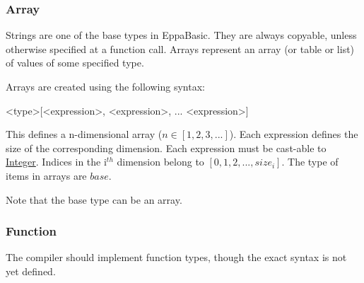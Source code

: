 \subsubsection{Array}
\label{type:Array}
Strings are one of the base types in EppaBasic.
They are always copyable, unless otherwise specified at a function call.
Arrays represent an array (or table or list) of values of some specified type.

Arrays are created using the following syntax:
\begin{grammar}
<type>[<expression>, <expression>, ... <expression>]
\end{grammar}
This defines a n-dimensional array ($n\in[1,2,3,...]$).
Each expression defines the size of the corresponding dimension.
Each expression must be cast-able to \hyperref[type:Integer]{Integer}.
Indices in the i$^{th}$ dimension belong to $[0,1,2,...,size_i]$.
The type of items in arrays are $base$.

Note that the base type can be an array.

\subsubsection{Function}
\label{type:Function}
The compiler should implement function types,
though the exact syntax is not yet defined.
